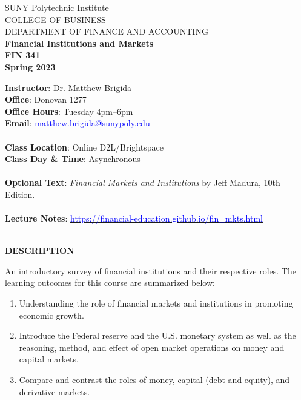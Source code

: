 \documentclass{article}
\begin{document}
\begin{center}
SUNY Polytechnic Institute \\
COLLEGE OF BUSINESS\\
DEPARTMENT OF FINANCE AND ACCOUNTING
\\
{\bf Financial Institutions and Markets}\\
{\bf FIN 341}\\
{\bf Spring 2023}\\
\end{center}
\vspace*{5pt}
{\bf Instructor}: Dr. Matthew Brigida\\
{\bf Office}: Donovan 1277\\
{\bf Office Hours}: Tuesday 4pm--6pm \\
{\bf Email}: \href{mailto:matthew.brigida@sunypoly.edu}{\textcolor{blue}{matthew.brigida@sunypoly.edu}}\\
\\
{\bf Class Location}:  Online D2L/Brightspace\\
{\bf Class Day \& Time}: Asynchronous \\
\\
  {\bf Optional Text}: {\it Financial Markets and Institutions} by Jeff Madura, 10th Edition.\\
  \\
  {\bf Lecture Notes}: \href{https://financial-education.github.io/fin_mkts.html}{\textcolor{blue}{\url{https://financial-education.github.io/fin_mkts.html}}}
\\
\\
\begin{center}
{\bf DESCRIPTION}
\end{center}  
An introductory survey of financial institutions and their respective roles. The
learning outcomes for this course are summarized below:
\begin{enumerate}
\item  Understanding the role of financial markets and institutions in promoting economic
growth. 
\item Introduce the Federal reserve and the U.S. monetary system as well as the reasoning,
method, and effect of open market operations on money and capital markets.
\item Compare and contrast the roles of money, capital (debt and equity), and derivative markets.
\end{enumerate}
\end{document}
